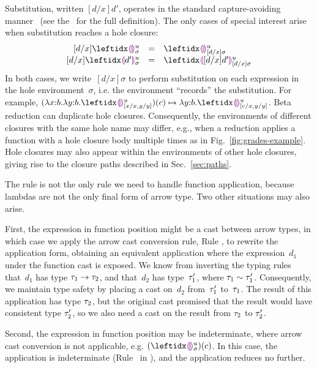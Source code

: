 


Substitution, written $[d/x]d'$, operates in the standard capture-avoiding manner~\cite{pfpl} (see the \appendixName~for the full definition).
%
The only cases of special interest arise when substitution reaches a hole closure:
\[
\begin{array}{rcl}
  [d/x]\dehole{u}{\sigma}{} & = & \dehole{u}{[d/x]\sigma}{} \\%
  \substitute{d}{x}{\dhole{d'}{u}{\sigma}{}} & = & \dhole{[d/x]d'}{u}{[d/x]\sigma}{}
\end{array}
\]
In both cases, we write~$[d/x]\sigma$ to perform substitution on each expression in the hole environment~$\sigma$, i.e. the environment ``records'' the substitution.
%
For example, $\stepsToD{}
    {\hap{(\halam{x}{b}{\halam{y}{b}{\dehole{u}{[x/x, y/y]}{}}})}{c}}
    {\halam{y}{b}{\dehole{u}{[c/x, y/y]}{}}}$.
%
Beta reduction can duplicate hole closures.
%
Consequently, the environments of different closures with the same hole name may differ,
e.g., when a reduction applies a function with a hole closure body multiple times as in Fig.~\ref{fig:grades-example}.
Hole closures may also appear within the environments of other hole
closures, giving rise to the closure paths described in
Sec.~\ref{sec:paths}.



The  rule is not the only rule we need to handle function
application, because lambdas are not the only final form of arrow type.
%
Two other situations may also arise.

First, the expression in function position might be a cast between
arrow types, in which case we apply the arrow cast conversion rule,
Rule , to rewrite the application form, obtaining an
equivalent application where the expression~$d_1$ under the function
cast is exposed.
%
We know from inverting the typing rules that~$d_1$ has type
$\tau_1 \rightarrow \tau_2$, and that~$d_2$ has type~$\tau_1'$, where
$\tau_1 \sim \tau_1'$.
Consequently, we maintain type
safety by placing a cast on~$d_2$ from~$\tau_1'$ to~$\tau_1$.
%
The result of this application has type $\tau_2$, but the
original cast promised that the result would have consistent type
$\tau_2'$, so we also need a cast on the result from $\tau_2$ to
$\tau_2'$.

Second, the expression in function position may be indeterminate,
where arrow cast conversion is not applicable,
e.g. $\hap{(\dehole{u}{\sigma}{})}{c}$.
%
In this case, the application is indeterminate (Rule~
in ), and the application reduces no
further.

